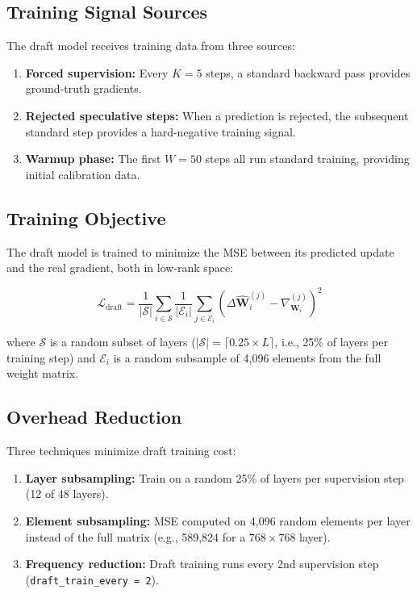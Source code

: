\documentclass[conference]{IEEEtran}
\begin{document}
\subsection{Training Signal Sources}

The draft model receives training data from three sources:
\begin{enumerate}
    \item \textbf{Forced supervision:} Every $K = 5$ steps, a standard backward pass provides ground-truth gradients.
    \item \textbf{Rejected speculative steps:} When a prediction is rejected, the subsequent standard step provides a hard-negative training signal.
    \item \textbf{Warmup phase:} The first $W = 50$ steps all run standard training, providing initial calibration data.
\end{enumerate}

\subsection{Training Objective}

The draft model is trained to minimize the MSE between its predicted update and the real gradient, both in low-rank space:

\begin{equation}
\mathcal{L}_{\mathrm{draft}} = \frac{1}{|\mathcal{S}|} \sum_{i \in \mathcal{S}} \frac{1}{|\mathcal{E}_i|} \sum_{j \in \mathcal{E}_i} \left(\Delta\hat{\mathbf{W}}_i^{(j)} - \nabla_{\mathbf{W}_i}^{(j)}\right)^2
\label{eq:draft_loss}
\end{equation}

\noindent where $\mathcal{S}$ is a random subset of layers ($|\mathcal{S}| = \lceil 0.25 \times L \rceil$, i.e., 25\% of layers per training step) and $\mathcal{E}_i$ is a random subsample of 4,096 elements from the full weight matrix.

\subsection{Overhead Reduction}

Three techniques minimize draft training cost:

\begin{enumerate}
    \item \textbf{Layer subsampling:} Train on a random 25\% of layers per supervision step (12 of 48 layers).
    \item \textbf{Element subsampling:} MSE computed on 4,096 random elements per layer instead of the full matrix (e.g., 589,824 for a $768 \times 768$ layer).
    \item \textbf{Frequency reduction:} Draft training runs every 2nd supervision step (\texttt{draft\_train\_every = 2}).
\end{enumerate}
\end{document}
